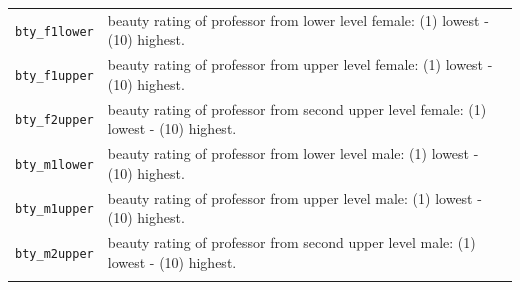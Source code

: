 \documentclass[]{book}
\theoremstyle{definition}
\theoremstyle{definition}
\theoremstyle{remark}
\begin{document}
\begin{longtable}[]{@{}ll@{}}
\begin{minipage}[t]{0.22\columnwidth}
\texttt{bty\_f1lower}\strut
\end{minipage} & \begin{minipage}[t]{0.16\columnwidth}\raggedright\strut
beauty rating of professor from lower level female: (1) lowest - (10)
highest.\strut
\end{minipage}\tabularnewline
\begin{minipage}[t]{0.22\columnwidth}\raggedright\strut
\texttt{bty\_f1upper}\strut
\end{minipage} & \begin{minipage}[t]{0.16\columnwidth}\raggedright\strut
beauty rating of professor from upper level female: (1) lowest - (10)
highest.\strut
\end{minipage}\tabularnewline
\begin{minipage}[t]{0.22\columnwidth}\raggedright\strut
\texttt{bty\_f2upper}\strut
\end{minipage} & \begin{minipage}[t]{0.16\columnwidth}\raggedright\strut
beauty rating of professor from second upper level female: (1) lowest -
(10) highest.\strut
\end{minipage}\tabularnewline
\begin{minipage}[t]{0.22\columnwidth}\raggedright\strut
\texttt{bty\_m1lower}\strut
\end{minipage} & \begin{minipage}[t]{0.16\columnwidth}\raggedright\strut
beauty rating of professor from lower level male: (1) lowest - (10)
highest.\strut
\end{minipage}\tabularnewline
\begin{minipage}[t]{0.22\columnwidth}\raggedright\strut
\texttt{bty\_m1upper}\strut
\end{minipage} & \begin{minipage}[t]{0.16\columnwidth}\raggedright\strut
beauty rating of professor from upper level male: (1) lowest - (10)
highest.\strut
\end{minipage}\tabularnewline
\begin{minipage}[t]{0.22\columnwidth}\raggedright\strut
\texttt{bty\_m2upper}\strut
\end{minipage} & \begin{minipage}[t]{0.16\columnwidth}\raggedright\strut
beauty rating of professor from second upper level male: (1) lowest -
(10) highest.\strut
\end{minipage}\tabularnewline
\begin{minipage}[t]{0.22\columnwidth}\raggedright\strut

\end{minipage}
\end{longtable}
\end{document}
